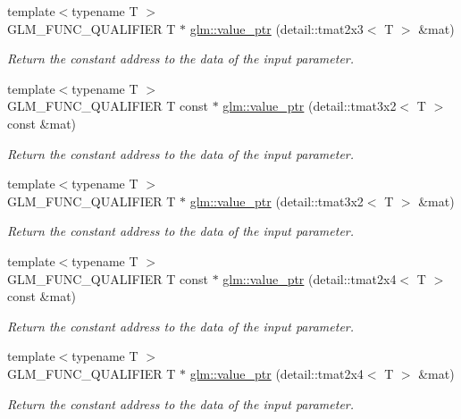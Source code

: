 \begin{DoxyCompactItemize}
{\footnotesize template$<$typename T $>$ }\\G\-L\-M\-\_\-\-F\-U\-N\-C\-\_\-\-Q\-U\-A\-L\-I\-F\-I\-E\-R T $\ast$ \hyperlink{group__gtc__type__ptr_gac99ce6d08fb5b645d543ea875567ea3b}{glm\-::value\-\_\-ptr} (detail\-::tmat2x3$<$ T $>$ \&mat)
\begin{DoxyCompactList}\small\item\em Return the constant address to the data of the input parameter. \end{DoxyCompactList}\item 
{\footnotesize template$<$typename T $>$ }\\G\-L\-M\-\_\-\-F\-U\-N\-C\-\_\-\-Q\-U\-A\-L\-I\-F\-I\-E\-R T const $\ast$ \hyperlink{group__gtc__type__ptr_gad58ae53d7a86bf7caadd7f1be2db3f1a}{glm\-::value\-\_\-ptr} (detail\-::tmat3x2$<$ T $>$ const \&mat)
\begin{DoxyCompactList}\small\item\em Return the constant address to the data of the input parameter. \end{DoxyCompactList}\item 
{\footnotesize template$<$typename T $>$ }\\G\-L\-M\-\_\-\-F\-U\-N\-C\-\_\-\-Q\-U\-A\-L\-I\-F\-I\-E\-R T $\ast$ \hyperlink{group__gtc__type__ptr_ga241b3c1e7e747ab934e2c38679fe90a5}{glm\-::value\-\_\-ptr} (detail\-::tmat3x2$<$ T $>$ \&mat)
\begin{DoxyCompactList}\small\item\em Return the constant address to the data of the input parameter. \end{DoxyCompactList}\item 
{\footnotesize template$<$typename T $>$ }\\G\-L\-M\-\_\-\-F\-U\-N\-C\-\_\-\-Q\-U\-A\-L\-I\-F\-I\-E\-R T const $\ast$ \hyperlink{group__gtc__type__ptr_ga6b5545ede3accc40f90aa05014406bcf}{glm\-::value\-\_\-ptr} (detail\-::tmat2x4$<$ T $>$ const \&mat)
\begin{DoxyCompactList}\small\item\em Return the constant address to the data of the input parameter. \end{DoxyCompactList}\item 
{\footnotesize template$<$typename T $>$ }\\G\-L\-M\-\_\-\-F\-U\-N\-C\-\_\-\-Q\-U\-A\-L\-I\-F\-I\-E\-R T $\ast$ \hyperlink{group__gtc__type__ptr_gad3ffa3b03348e1c71b509023d0e48436}{glm\-::value\-\_\-ptr} (detail\-::tmat2x4$<$ T $>$ \&mat)
\begin{DoxyCompactList}\small\item\em Return the constant address to the data of the input parameter. \end{DoxyCompactList}\item 

\end{DoxyCompactItemize}
